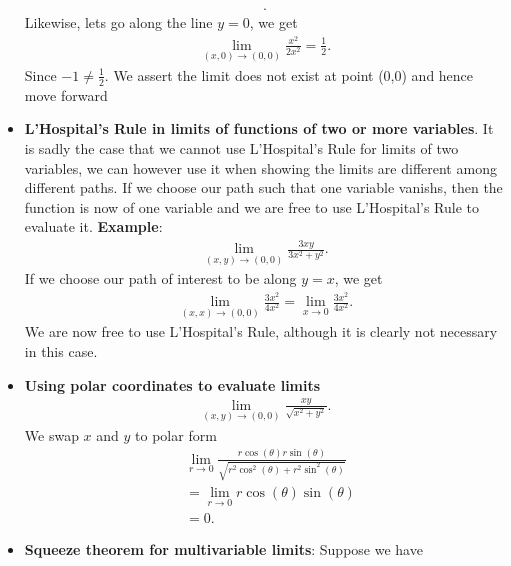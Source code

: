 \documentclass{report}
\begin{document}
\begin{itemize}
\begin{align*}
                .\end{align*}
                Likewise, lets go along the line $y=0$, we get
                \begin{align*}
                    \lim\limits_{(x,0) \to (0,0)}{\frac{x^{2}}{2x^{2}}} = \frac{1}{2}
                .\end{align*}
                Since $-1 \neq \frac{1}{2}$. We assert the limit does not exist at point (0,0) and hence move forward
            \item \textbf{ L'Hospital's Rule in limits of functions of two or more variables}. It is sadly the case that we cannot use L'Hospital's Rule for limits of two variables, we can however use it when showing the limits are different among different paths. If we choose our path such that one variable vanishs, then the function is now of one variable and we are free to use L'Hospital's Rule to evaluate it.
                \bigbreak \noindent 
                \textbf{Example}:
                \begin{align*}
                    \lim\limits_{(x,y) \to (0,0)}{\frac{3xy}{3x^{2} + y^{2}}}
                .\end{align*}
                If we choose our path of interest to be along $y=x$, we get 
                \begin{align*}
                    \lim\limits_{(x,x) \to (0,0)}{\frac{3x^{2}}{4x^{2}}} = \lim\limits_{x \to 0}{\frac{3x^{2}}{4x^{2}}}
                .\end{align*}
                We are now free to use L'Hospital's Rule, although it is clearly not necessary in this case.
            \item \textbf{Using polar coordinates to evaluate limits}
                \begin{align*}
                    \lim\limits_{(x,y) \to (0,0)}{\frac{xy}{\sqrt{x^{2}+y^{2}}}}
                .\end{align*}
                We swap $x$ and $y$ to polar form
                \begin{align*}
                    &\lim\limits_{r \to 0}{\frac{r\cos{\left(\theta\right)}r\sin{\left(\theta\right)}}{\sqrt{r^{2}\cos^{2}{\left(\theta\right)}+r^{2}\sin^{2}{\left(\theta \right)}}}} \\
                    &=\lim\limits_{r \to 0}{r\cos{\left(\theta\right)}\sin{\left(\theta\right)}} \\
                    &=0
                .\end{align*}
            \item \textbf{Squeeze theorem for multivariable limits}: Suppose we have

\end{itemize}
\end{document}
